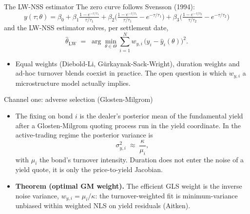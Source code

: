 \documentclass[aspectratio=169,11pt]{beamer}
\begin{document}
\begin{frame}{The LW-NSS estimator}
  \small The zero curve follows Svensson (1994):
  \[ y(\tau;\theta) = \beta_0
     + \beta_1 \tfrac{1-e^{-\tau/\tau_1}}{\tau/\tau_1}
     + \beta_2 \Big( \tfrac{1-e^{-\tau/\tau_1}}{\tau/\tau_1} - e^{-\tau/\tau_1} \Big)
     + \beta_3 \Big( \tfrac{1-e^{-\tau/\tau_2}}{\tau/\tau_2} - e^{-\tau/\tau_2} \Big) \]
  and the LW-NSS estimator solves, per settlement date,
  \[ \hat\theta_{\mathrm{LW}} \;=\; \arg\min_{\theta\in\Theta} \sum_{i=1}^{N}
     w_{y,i}\, \big( y_i - \hat y_i(\theta) \big)^2 . \]
  \begin{itemize}
    \item Equal weights (Diebold-Li, G\"urkaynak-Sack-Wright), duration
          weights and ad-hoc turnover blends coexist in practice. The open
          question is which $w_{y,i}$ a microstructure model actually implies.
  \end{itemize}
\end{frame}

\begin{frame}{Channel one: adverse selection (Glosten-Milgrom)}
  \begin{itemize}
    \item The fixing on bond $i$ is the dealer's posterior mean of the
          fundamental yield after a Glosten-Milgrom quoting process run in
          the yield coordinate. In the active-trading regime the posterior
          variance is
          \[ \sigma_{y,i}^2 \;\approx\; \frac{\kappa}{\mu_i}, \]
          with $\mu_i$ the bond's turnover intensity. Duration does not enter
          the noise of a yield quote, it is only the price-to-yield Jacobian.
    \item \textbf{Theorem (optimal GM weight).} The efficient GLS weight is
          the inverse noise variance, $w_{y,i} = \mu_i/\kappa$: the
          turnover-weighted fit is minimum-variance unbiased within weighted
          NLS on yield residuals (Aitken).
  \end{itemize}
\end{frame}
\end{document}
